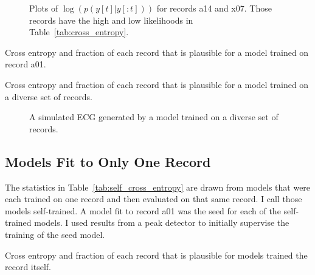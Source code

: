 \documentclass[12pt]{article}
\begin{document}
\begin{figure}
  \centering
  \caption{Plots of $\log\left(p(y[t]|y[:t]) \right)$ for records a14
    and x07.  Those records have the high and low likelihoods in
    Table~\ref{tab:cross_entropy}.}
  \label{fig:likelihood}
\end{figure}

\begin{table}
  \centering
    
  \caption[Cross Entropy]{Cross entropy and fraction of each record
    that is plausible for a model trained on record a01.}
  \label{tab:cross_entropy}
\end{table}

\begin{table}
  \centering
    
  \caption[Cross Entropy]{Cross entropy and fraction of each record
    that is plausible for a model trained on a diverse set of records.}
  \label{tab:diverse_cross_entropy}
\end{table}

\begin{figure}
  \centering
  \caption{A simulated ECG generated by a model trained on a diverse
    set of records.}
  \label{fig:simulated}
\end{figure}

\subsection{Models Fit to Only One Record}
\label{sec:selves}

The statistics in Table~\ref{tab:self_cross_entropy} are drawn from
models that were each trained on one record and then evaluated on that
same record.  I call those models self-trained.  A model fit to record
a01 was the seed for each of the self-trained models.  I used results
from a peak detector to initially supervise the training of the seed
model.

\begin{table}
  \centering
    
  \caption[Cross Entropy]{Cross entropy and fraction of each record
    that is plausible for models trained the record itself.}
  \label{tab:self_cross_entropy}
\end{table}
\end{document}
